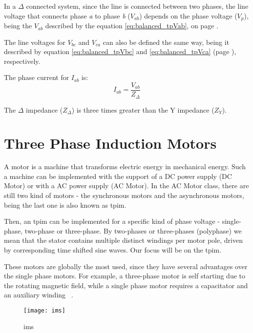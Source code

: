 In a $\Delta$ connected system, since the line is connected between two phases, the line voltage that connects phase \emph{a} to phase \emph{b} ($V_{ab}$) depends on the phase voltage ($V_{p}$), being the $V_{ab}$ described by the equation \ref{eq:balanced_tpVab}, on page \pageref{eq:balanced_tpVab}.

The line voltages for $V_{bc}$ and $V_{ca}$ can also be defined the same way, being it described by equation \ref{eq:balanced_tpVbc} and \ref{eq:balanced_tpVca} (page \pageref{eq:balanced_tpVab}), respectively. 

The phase current for $I_{ab}$ is:
\begin{equation} \label{eq:balanced_tpIab}
	I_{ab} = \frac{V_{ab}}{Z_{\Delta}}
\end{equation}

The $\Delta$ impedance ($Z_{\Delta}$) is three times greater than the Y impedance ($Z_{Y}$).




\section{Three Phase Induction Motors} %
\label{sec:three_phase_induction_motors}

A motor is a machine that transforms electric energy in mechanical energy.
Such a machine can be implemented with the support of a DC power supply (DC Motor) or with a AC power supply (AC Motor).
In the AC Motor class, there are still two kind of motors - the synchronous motors and the asynchronous motors, being the last one is also known as \acrfull{tpim}.


Then, an \acrshort{tpim} can be implemented for a specific kind of phase voltage - single-phase, two-phase or three-phase.
By two-phases or three-phases (polyphase) we mean that the stator contains multiple distinct windings per motor pole, driven by corresponding time shifted sine waves.
Our focus will be on the \acrfull{tpim}.

These motors are  globally the most used, since they have several advantages over the single phase motors. For example, a three-phase motor is self starting due to the rotating magnetic field, while a single phase motor requires a capacitator and an auxiliary winding ~\cite{Ferreira1}.

\begin{figure}[htbp]
	\centering
	\texttt{[image: ims]}
	\caption{\Acrlong{ims}}
	\label{fig:ims}
\end{figure}

